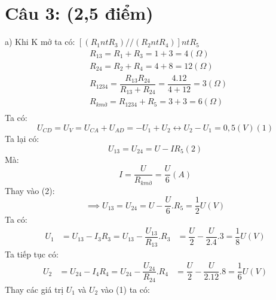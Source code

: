 \documentclass[50pt]{article}
\begin{document}
\section*{\color[HTML]{4287f5}Câu 3: (2,5 điểm)}
a) Khi K mở ta có: $[(R_{1} nt R_{3}) // (R_{2} nt R_{4})] nt R_{5}$\\
\begin{equation*}
    \begin{aligned}
        & R_{13} = R_{1} + R_{3} = 1 + 3 = 4 (\Omega)\\
        & R_{24} = R_{2} + R_{4} = 4 + 8 = 12 (\Omega)\\
        & R_{1234} = \dfrac{R_{13}R_{24}}{R_{13} + R_{24}} = \dfrac{4.12}{4 + 12} = 3 (\Omega) \\
        & R_{k mở} = R_{1234} + R_{5} = 3 + 3 = 6 (\Omega) \\
    \end{aligned}
\end{equation*}
Ta có:
\begin{equation*}
    U_{CD} = U_{V} = U_{CA} + U_{AD} = -U_{1} + U_{2}
    \leftrightarrow U_{2} - U_{1} = 0,5 (V) (1)
\end{equation*}
Ta lại có:
\begin{equation*}
    U_{13} = U_{24} = U - IR_{5} (2)
\end{equation*}
Mà:
\begin{equation*}
    I = \dfrac{U}{R_{k mở}} = \dfrac{U}{6} (A)
\end{equation*}
Thay vào (2):
\begin{equation*}
    \implies U_{13} = U_{24} = U - \dfrac{U}{6}.R_{5} = \dfrac{1}{2}U (V)
\end{equation*}
Ta có:
\begin{equation*}
    \begin{aligned}
        U_{1} & = U_{13} - I_{3}R_{3} = U_{13} - \dfrac{U_{13}}{R_{13}}.R_{3}
              & = \dfrac{U}{2} - \dfrac{U}{2.4}.3 = \dfrac{1}{8}U (V)
    \end{aligned}
\end{equation*}
Ta tiếp tục có:
\begin{equation*}
    \begin{aligned}
        U_{2} & = U_{24} - I_{4}R_{4} = U_{24} - \dfrac{U_{24}}{R_{24}}.R_{4}
              & = \dfrac{U}{2} - \dfrac{U}{2.12}.8 = \dfrac{1}{6}U (V)
    \end{aligned}
\end{equation*}
Thay các giá trị $U_{1}$ và $U_{2}$ vào (1) ta có:\\
\end{document}

